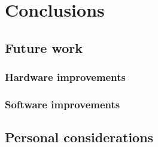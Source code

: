 
\chapter{Conclusions}\label{ch:conclusions}

	\section{Future work}
	
		\subsection{Hardware improvements}
			

		\subsection{Software improvements}

	\section{Personal considerations}
